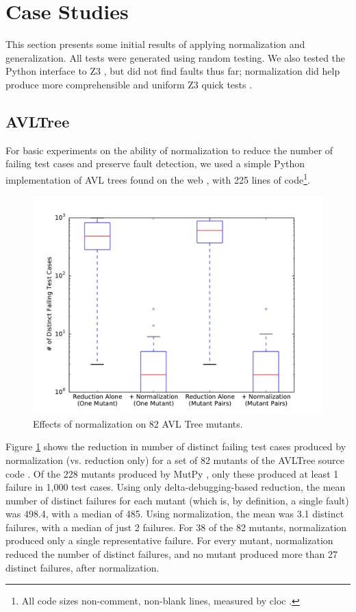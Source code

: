 \section {Case Studies}

This section presents some initial results of applying normalization
and generalization.   All tests were generated using
random testing.  We also tested the Python interface to Z3 \cite{z3},
but did not find faults thus far; normalization did help produce more
comprehensible and uniform Z3
quick tests \cite{icst2014}.

\subsection{AVLTree}

For basic experiments on the ability of normalization to reduce the
number of failing test cases and preserve fault detection, we used a
simple Python implementation of AVL trees found on the web
\cite{avltree}, with 225 lines of code\footnote{All code sizes non-comment, non-blank lines, measured by cloc \cite{cloc}.}.

\begin{figure}
\includegraphics[width=\columnwidth]{length}
\caption{Effects of normalization on 82 AVL Tree mutants.}
\label{normeffect}
\end{figure}

Figure \ref{normeffect} shows the reduction in number of distinct
failing test cases produced by normalization (vs. reduction only) for
a set of 82 mutants \cite{mutant} of the AVLTree source code \cite{Hunter:2007}.  Of the 228 mutants
produced by MutPy \cite{mutpy}, only these produced at least 1 failure
in 1,000 test cases.  Using only delta-debugging-based reduction, the
mean number of distinct failures for each mutant (which is, by definition,
a single fault) was 498.4, with a median of 485.  Using normalization,
the mean was 3.1 distinct failures, with a median of just 2 failures.
For 38 of the 82 mutants, normalization produced only a single
representative failure.  For every mutant, normalization reduced the
number of distinct failures, and no mutant produced more than 27
distinct failures, after normalization.


